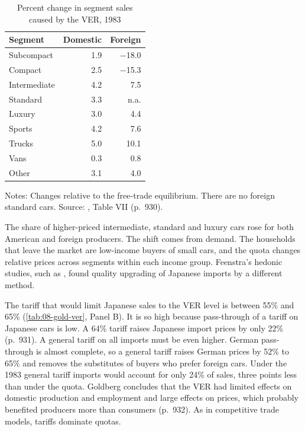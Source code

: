 \begin{table}[htbp]
\centering
\caption{Percent change in segment sales caused by the VER, 1983}
\label{tab:08-gold-segments}
\footnotesize
\begin{tabular}{@{}lrr@{}}
\toprule
Segment & Domestic & Foreign \\
\midrule
Subcompact & 1.9 & $-$18.0 \\
Compact & 2.5 & $-$15.3 \\
Intermediate & 4.2 & 7.5 \\
Standard & 3.3 & n.a. \\
Luxury & 3.0 & 4.4 \\
Sports & 4.2 & 7.6 \\
Trucks & 5.0 & 10.1 \\
Vans & 0.3 & 0.8 \\
Other & 3.1 & 4.0 \\
\bottomrule
\end{tabular}

\smallskip
\begin{minipage}{0.62\linewidth}
\footnotesize Notes: Changes relative to the free-trade equilibrium. There are no foreign standard cars. Source:
\citet{Goldberg1995}, Table VII (p.~930).
\end{minipage}
\end{table}

The share of higher-priced intermediate, standard and luxury cars rose for both American and foreign producers.
The shift comes from demand. The households that leave the market
are low-income buyers of small cars, and the quota changes relative prices across segments within each income
group. Feenstra's hedonic studies, such as \citet{Feenstra1988}, found quality upgrading of Japanese imports by
a different method.

 The tariff that would limit Japanese sales to the VER level is between 55\% and
65\% (\cref{tab:08-gold-ver}, Panel B). It is so high because pass-through of a tariff on Japanese cars is low.
A 64\% tariff raises Japanese import prices by only 22\% (p.~931). A general tariff on all imports must be even
higher. German pass-through is almost complete, so a general tariff raises German prices by 52\% to 65\% and
removes the substitutes of buyers who prefer foreign cars. Under the 1983 general tariff imports would account
for only 24\% of sales, three points less than under the quota. Goldberg concludes that the VER had limited
effects on domestic production and employment and large effects on prices, which probably benefited producers
more than consumers (p.~932). As in competitive trade models, tariffs dominate quotas.

